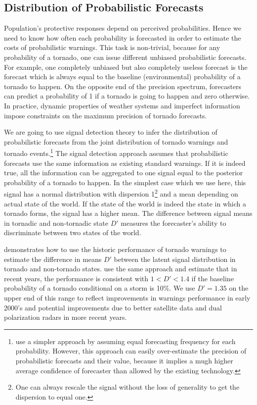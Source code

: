 \documentclass{ametsocV6.1}
\begin{document}
\vspace{10pt}
\subsection{Distribution of Probabilistic Forecasts} 
Population's protective responses depend on perceived probabilities. Hence we need to know how often each probability is forecasted in order to estimate the costs of probabilistic warnings. This task is non-trivial, because for any probability of a tornado, one can issue different unbiased probabilistic forecasts. For example, one completely unbiased but also completely useless forecast is the forecast which is always equal to the baseline (environmental) probability of a tornado to happen. On the opposite end of the precision spectrum, forecasters can predict a probability of 1 if a tornado is going to happen and zero otherwise. In practice, dynamic properties of weather systems and imperfect information impose constraints on the maximum precision of tornado forecasts.

We are going to use signal detection theory to infer the distribution of probabilistic forecasts from the joint distribution of tornado warnings and tornado events.\footnote{\citet{howard_firm_2021} use a simpler approach by assuming equal forecasting frequency for each probability. However, this approach can easily over-estimate the precision of probabilistic forecasts and their value, because it implies a mugh higher average confidence of forecaster than allowed by the existing technology.} The signal detection approach assumes that probabilistic forecasts use the same information as existing standard warnings. If it is indeed true, all the information can be aggregated to one signal equal to the posterior probability of a tornado to happen. In the simplest case which we use here, this signal has a normal distribution with dispersion 1\footnote{One can always rescale the signal without the loss of generality to get the dispersion to equal one.} and a mean depending on actual state of the world. If the state of the world is indeed the state in which a tornado forms, the signal has a higher mean. The difference between signal means in tornadic and non-tornadic state $D'$ measures the forecaster's ability to discriminate between two states of the world.

\citet{brooks_tornado-warning_2004} demonstrates how to use the historic performance of tornado warnings to estimate the difference in means $D'$ between the latent signal distribution in tornado and non-tornado states. \citet{brooks_long-term_2018} use the same approach and estimate that in recent years, the performance is consistent with $1<D'<1.4$ if the baseline probability of a tornado conditional on a storm is 10\%. We use $D'=1.35$ on the upper end of this range to reflect improvements in warnings performance in early 2000's and potential improvements due to better satellite data and dual polarization radars in more recent years. 
\end{document}
